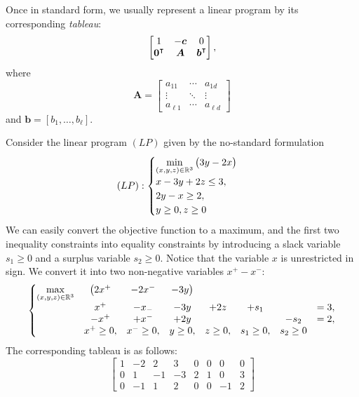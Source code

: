 \separator 

Once in standard form, we usually represent a linear program by its corresponding \emph{tableau}:
\begin{equation*}
\begin{bmatrix} 1 & -\boldsymbol{c} & 0 \\ {\boldsymbol{0}}^\intercal & \boldsymbol{A} & {\boldsymbol{b}}^\intercal \end{bmatrix},
\end{equation*}
where
\begin{equation*}
\boldsymbol{A} = \begin{bmatrix} a_{11} & \dotsb & a_{1d} \\ \vdots & \ddots & \vdots \\ a_{\ell 1} & \dotsb & a_{\ell d} \end{bmatrix}
\end{equation*}
and $\boldsymbol{b} = [b_1, \dotsc, b_\ell]$.

\begin{example}\label{example:FirstLinearProgram}
Consider the linear program $(LP)$ given by the no-standard formulation
\begin{equation*}
(LP): \begin{cases}
\displaystyle{\min_{(x,y,z) \in \mathbb{R}^3} \big( 3y-2x \big)} \\
x - 3y + 2z \leq 3, \\
2y-x \geq 2, \\
y \geq 0, z \geq 0 \\
\end{cases}
\end{equation*}
We can easily convert the objective function to a maximum, and the first two inequality constraints into equality constraints by introducing a slack variable $s_1 \geq 0$ and a surplus variable $s_2 \geq 0$.  Notice that the variable $x$ is unrestricted in sign.  We convert it into two non-negative variables $x^+ - x^-$:
\begin{equation*}
\left\{
\begin{matrix}
\displaystyle{\max_{(x,y,z) \in \mathbb{R}^3}} & \big( 2x^+ & -2x^- &-3y \big) \\
& x^+ & -x_- & -3y & +2z & +s_1 & & = 3, \\
& -x^+ & +x^- & +2y & & &-s_2 &= 2, \\
&x^+ \geq 0, &x^- \geq 0, &y \geq 0, &z \geq 0, &s_1 \geq 0, &s_2 \geq 0 
\end{matrix}
\right.
\end{equation*}
The corresponding tableau is as follows:
\begin{equation*}
\begin{bmatrix}
1 & -2 & 2  & 3  & 0 & 0 & 0  & 0\\
0 & 1  & -1 & -3 & 2 & 1 & 0  & 3 \\
0 & -1 &  1 & 2  & 0 & 0 & -1 & 2
\end{bmatrix}
\end{equation*}
\end{example}

